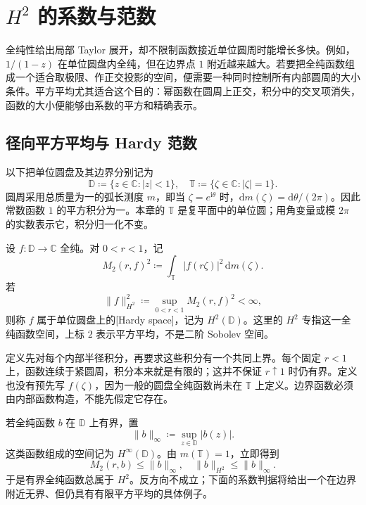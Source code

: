 \section{\texorpdfstring{\(H^2\)}{H²} 的系数与范数}
\label{b3:sec:2801}
全纯性给出局部 Taylor 展开，却不限制函数接近单位圆周时能增长多快。例如，\(1/(1-z)\) 在单位圆盘内全纯，但在边界点 \(1\) 附近越来越大。若要把全纯函数组成一个适合取极限、作正交投影的空间，便需要一种同时控制所有内部圆周的大小条件。平方平均尤其适合这个目的：幂函数在圆周上正交，积分中的交叉项消失，函数的大小便能够由系数的平方和精确表示。

\subsection{径向平方平均与 Hardy 范数}
\label{b3:subsec:280101}

以下把单位圆盘及其边界分别记为
\[
 \mathbb D\coloneqq\{z\in\mathbb C:|z|<1\},
 \quad \mathbb T\coloneqq\{\zeta\in\mathbb C:|\zeta|=1\}.
\]
圆周采用总质量为一的弧长测度 \(m\)，即当 \(\zeta=e^{\mathrm i\theta}\) 时，\(\mathrm dm(\zeta)=\mathrm d\theta/(2\pi)\)。因此常数函数 \(1\) 的平方积分为一。本章的 \(\mathbb T\) 是复平面中的单位圆；用角变量或模 \(2\pi\) 的实数表示它，积分归一化不变。

\begin{definition}\label{b3:def:28-hardy-space}
设 \(f:\mathbb D\to\mathbb C\) 全纯。对 \(0<r<1\)，记
\[
 M_2(r,f)^2\coloneqq
 \int_{\mathbb T}|f(r\zeta)|^2\,\mathrm dm(\zeta).
\]
若
\[
 \|f\|_{H^2}^2\coloneqq\sup_{0<r<1}M_2(r,f)^2<\infty,
\]
则称 \(f\) 属于单位圆盘上的[Hardy space]，记为 \(H^2(\mathbb D)\)。这里的 \(H^2\) 专指这一全纯函数空间，上标 \(2\) 表示平方平均，不是二阶 Sobolev 空间。
\end{definition}

定义先对每个内部半径积分，再要求这些积分有一个共同上界。每个固定 \(r<1\) 上，函数连续于紧圆周，积分本来就是有限的；这并不保证 \(r\uparrow1\) 时仍有界。定义也没有预先写 \(f(\zeta)\)，因为一般的圆盘全纯函数尚未在 \(\mathbb T\) 上定义。边界函数必须由内部函数构造，不能先假定它存在。

\ProseParagraphBreak
若全纯函数 \(b\) 在 \(\mathbb D\) 上有界，置
\[
 \|b\|_\infty\coloneqq\sup_{z\in\mathbb D}|b(z)|.
\]
这类函数组成的空间记为 \(H^\infty(\mathbb D)\)。由 \(m(\mathbb T)=1\)，立即得到
\[
 M_2(r,b)\le\|b\|_\infty,
 \quad \|b\|_{H^2}\le\|b\|_\infty.
\]
于是有界全纯函数总属于 \(H^2\)。反方向不成立；下面的系数判据将给出一个在边界附近无界、但仍具有有限平方平均的具体例子。


